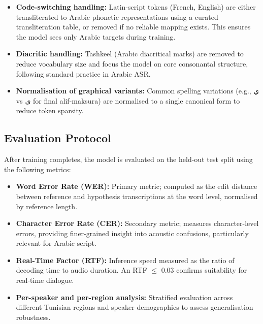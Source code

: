 \documentclass[12pt,a4paper]{report}
\newcommand{\ar}[1]{\textarabic{#1}} %
\begin{document}
\begin{itemize}
    \item \textbf{Code-switching handling:} Latin-script tokens (French, English) are
    either transliterated to Arabic phonetic representations using a curated transliteration
    table, or removed if no reliable mapping exists. This ensures the model sees only
    Arabic targets during training.

    \item \textbf{Diacritic handling:} Tashkeel (Arabic diacritical marks) are removed to
    reduce vocabulary size and focus the model on core consonantal structure, following
    standard practice in Arabic ASR.

    \item \textbf{Normalisation of graphical variants:} Common spelling variations
    (e.g., \ar{ي} vs \ar{ى} for final alif-maksura) are normalised to a single canonical
    form to reduce token sparsity.
\end{itemize}

\subsection{Evaluation Protocol}

After training completes, the model is evaluated on the held-out test split using the
following metrics:

\begin{itemize}
    \item \textbf{Word Error Rate (WER):} Primary metric; computed as the edit distance
    between reference and hypothesis transcriptions at the word level, normalised by
    reference length.

    \item \textbf{Character Error Rate (CER):} Secondary metric; measures character-level
    errors, providing finer-grained insight into acoustic confusions, particularly relevant
    for Arabic script.

    \item \textbf{Real-Time Factor (RTF):} Inference speed measured as the ratio of
    decoding time to audio duration. An RTF $\leq$ 0.03 confirms suitability for
    real-time dialogue.

    \item \textbf{Per-speaker and per-region analysis:} Stratified evaluation across
    different Tunisian regions and speaker demographics to assess generalisation robustness.
\end{itemize}
\end{document}
